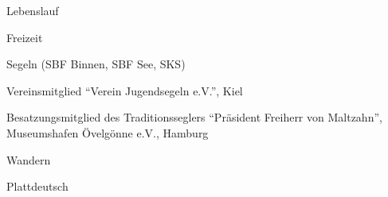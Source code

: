 \documentclass[11pt,a4paper]{scrartcl}
\begin{document}
\begin{cv}{Lebenslauf}

\begin{cvlist}{Freizeit}
\item Segeln (SBF Binnen, SBF See, SKS)
\item Vereinsmitglied "`Verein Jugendsegeln e.V."', Kiel
\item Besatzungsmitglied des Traditionsseglers "`Pr\"asident Freiherr
von Maltzahn"', Museumshafen \"Ovelg\"onne e.V., Hamburg
\item Wandern
\item Plattdeutsch
\end{cvlist}


\date{26.~Juli~2014}

\end{cv}
\end{document}
